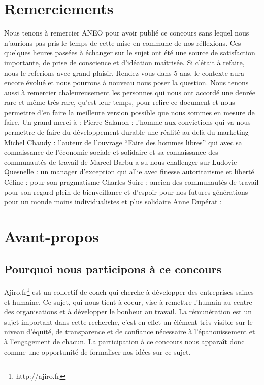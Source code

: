 \documentclass[12pt]{article}
\begin{document}
\section{Remerciements}
Nous tenons à remercier ANEO pour avoir publié ce concours sans lequel nous n’aurions pas pris le temps de cette mise en commune de nos réflexions. Ces quelques heures passées à échanger sur le sujet ont été une source de satisfaction importante, de prise de conscience et d’idéation maîtrisée. Si c’était à refaire, nous le referions avec grand plaisir. Rendez-vous dans 5 ans, le contexte aura encore évolué et nous pourrons à nouveau nous poser la question. 
Nous tenons aussi à remercier chaleureusement les personnes qui nous ont accordé une denrée rare et même très rare, qu’est leur temps, pour relire ce document et nous permettre d’en faire la meilleure version possible que nous sommes en mesure de faire. Un grand merci à :
Pierre Salanon : l’homme aux convictions qui va nous permettre de faire du développement durable une réalité au-delà du marketing
Michel Chaudy : l’auteur de l’ouvrage “Faire des hommes libres” qui avec sa connaissance de l’économie sociale et solidaire et sa connaissance des communautés de travail de Marcel Barbu a su nous challenger sur 
Ludovic Quesnelle : un manager d’exception qui allie avec finesse autoritarisme et liberté
Céline : pour son pragmatisme
Charles Suire : ancien des communautés de travail pour son regard plein de bienveillance et d’espoir pour nos futures générations pour un monde moins individualistes et plus solidaire
Anne Dupérat :


\section{Avant-propos}
\subsection{Pourquoi nous participons à ce concours}
 Ajiro.fr\footnote{http://ajiro.fr} est un collectif de coach qui cherche à développer des entreprises saines et humaine. Ce sujet, qui nous tient à coeur, vise à remettre l’humain au centre des organisations et à développer le bonheur au travail.
 La rémunération est un sujet important dans cette recherche, c’est en effet un élément très visible sur le niveau d’équité, de transparence et de confiance nécessaire à l'épanouissement et à l’engagement de chacun.
 La participation à ce concours nous apparaît donc comme une opportunité de formaliser nos idées sur ce sujet.
\end{document}
